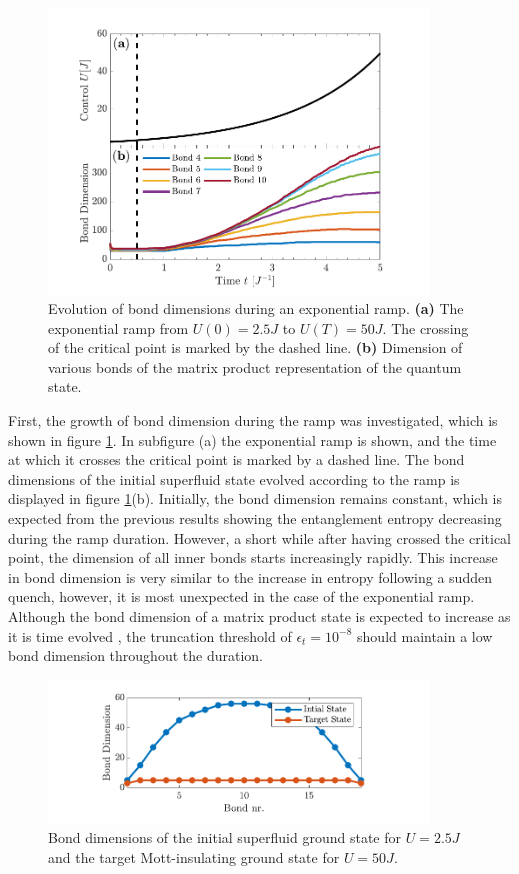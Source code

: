 \begin{figure}[h!]
    \centering
    \includegraphics[width=0.9\textwidth]{Figures/L20/BondDimEvolution.pdf}
    \caption{ Evolution of bond dimensions during an exponential ramp. \textbf{(a)} The exponential ramp from $U(0) = 2.5 J$ to $U(T) = 50 J$. The crossing of the critical point is marked by the dashed line. \textbf{(b)} Dimension of various bonds of the matrix product representation of the quantum state. }
    \label{fig:BondDimEvolution}
\end{figure}
First, the growth of bond dimension during the ramp was investigated, which is shown in figure \ref{fig:BondDimEvolution}. In subfigure (a) the exponential ramp is shown, and the time at which it crosses the critical point is marked by a dashed line. The bond dimensions of the initial superfluid state evolved according to the ramp is displayed in figure \ref{fig:BondDimEvolution}(b). Initially, the bond dimension remains constant, which is expected from the previous results showing the entanglement entropy decreasing during the ramp duration. However, a short while after having crossed the critical point, the dimension of all inner bonds starts increasingly rapidly. This increase in bond dimension is very similar to the increase in entropy following a sudden quench, however, it is most unexpected in the case of the exponential ramp. Although the bond dimension of a matrix product state is expected to increase as it is time evolved \cite{Daley2004}, the truncation threshold of $\epsilon_t = 10^{-8}$ should maintain a low bond dimension throughout the duration.
\begin{figure}[h!]
    \centering
    \includegraphics[width=0.9\textwidth]{Figures/L20/InitialBondDim.pdf}
    \caption{ Bond dimensions of the initial superfluid ground state for $U = 2.5 J $ and the target Mott-insulating ground state for $U = 50 J $.}
    \label{fig:InitialBondDim}
\end{figure}
